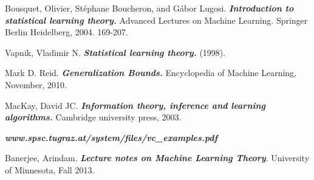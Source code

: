 \documentclass[12pt,reqno]{amsart}
\begin{document}
\begin{thebibliography}{99} %

Bousquet, Olivier, Stéphane Boucheron, and Gábor Lugosi. \textbf{\textit{Introduction to statistical learning theory.}} Advanced Lectures on Machine Learning. Springer Berlin Heidelberg, 2004. 169-207.


Vapnik, Vladimir N. \textbf{\textit{Statistical learning theory.}} (1998).

Mark D. Reid.
\textbf{\textit{Generalization Bounds.}}
Encyclopedia of Machine Learning, November, 2010.

MacKay, David JC. \textbf{\textit{Information theory, inference and learning algorithms.}} Cambridge university press, 2003.

\textit{\textbf{www.spsc.tugraz.at/system/files/vc\_examples.pdf‎}}

Banerjee, Arindam. \textit{\textbf{Lecture notes on Machine Learning Theory}}. University of Minnesota, Fall 2013.


\end{thebibliography}
\end{document}
